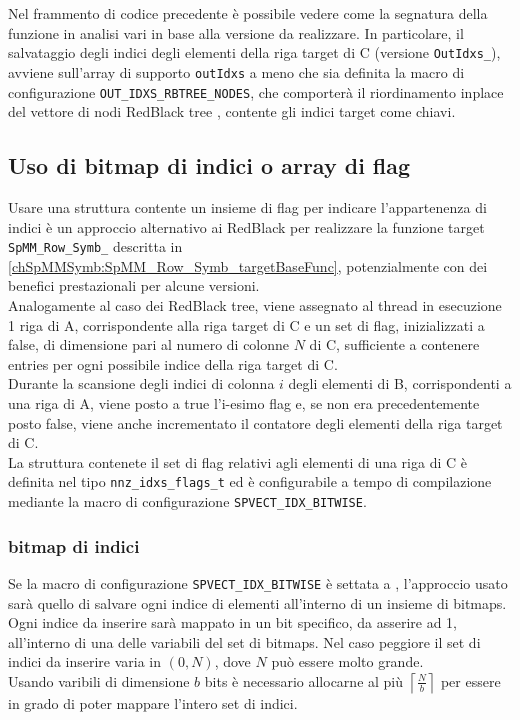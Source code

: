 Nel frammento di codice precedente è possibile vedere come la segnatura della funzione in analisi vari in base alla versione da realizzare.
In particolare, il salvataggio degli indici \nnz degli elementi della riga target di C (versione \verb|OutIdxs_|), avviene sull'array di supporto 
\verb|outIdxs| a meno che sia definita la macro di configurazione \verb|OUT_IDXS_RBTREE_NODES|, che comporterà il riordinamento inplace del vettore di 
nodi RedBlack tree , contente gli indici target come chiavi.\\


\subsection{Uso di bitmap di indici o array di flag} \label{chSpMMSymb:structFlagSet}
Usare una struttura contente un insieme di flag per indicare l'appartenenza di indici è un approccio alternativo ai RedBlack
per realizzare la funzione target \verb|SpMM_Row_Symb_| descritta in \ref{chSpMMSymb:SpMM_Row_Symb_targetBaseFunc}, 
potenzialmente con dei benefici prestazionali per alcune versioni.\\
Analogamente al caso dei RedBlack tree, viene assegnato al thread in esecuzione 
1 riga di A, corrispondente alla riga target di C e 
un set di flag, inizializzati a false, di dimensione pari al numero di colonne $N$ di C,
sufficiente a contenere entries per ogni possibile indice della riga target di C.\\
Durante la scansione degli indici di colonna $i$ degli elementi \nnz di B, corrispondenti a una riga di A, 
viene posto a true l'i-esimo flag e, se non era precedentemente posto false, viene anche incrementato il 
contatore degli elementi \nnz della riga target di C.\\
La struttura contenete il set di flag relativi agli elementi \nnz di una riga di C 
è definita nel tipo \verb|nnz_idxs_flags_t| ed è 
configurabile a tempo di compilazione mediante la macro di configurazione \verb|SPVECT_IDX_BITWISE|.
\subsubsection{bitmap di indici}		\label{chSpMMSymb:bitmapsUse}
Se la macro di configurazione \verb|SPVECT_IDX_BITWISE| è settata a , l'approccio usato sarà quello 
di salvare ogni indice di elementi \nnz all'interno di un insieme di bitmaps.\\
Ogni indice da inserire sarà mappato in un bit specifico, da asserire ad 1, all'interno di una delle variabili del set di bitmaps.
Nel caso peggiore il set di indici da inserire varia in $(0,N)$, dove $N$ può essere molto grande.\\ 
Usando varibili di dimensione $b$ bits è necessario allocarne al più $\left\lceil \frac{N}{b}  \right\rceil$
per essere in grado di poter mappare l'intero set di indici.\\

